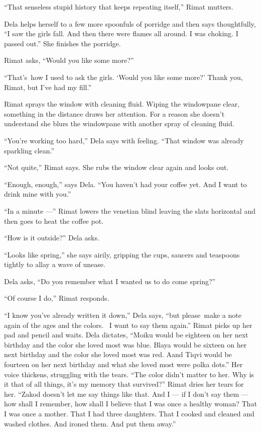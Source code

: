\documentclass[twoside,11pt,openany]{book}
\begin{document}
``That senseless stupid history that keeps repeating itself,'' Rimat mutters.

Dela helps herself to a few more spoonfuls of porridge and then says thoughtfully, ``I saw the girls fall.
And then there were flames all around. I was choking. I passed out.'' She finishes the porridge.

Rimat asks, ``Would you like some more?''

``That's~how I used to ask the girls. `Would you like some more?' Thank you, Rimat, but I've had my
fill.''

Rimat sprays the window with cleaning fluid. Wiping the windowpane clear, something{ }in the distance
draws her attention. For a reason she doesn't understand she blurs the windowpane with another spray of cleaning fluid.


``You're working too hard,'' Dela says with feeling. ``That window was already
sparkling clean.''

``Not quite,'' Rimat says. She rubs the window clear again and looks out.

``Enough, enough,'' says Dela. ``You haven't had your coffee yet.
And{ }I want to drink mine with you.''

``In a minute ---'' Rimat lowers the venetian blind leaving the slats horizontal and then goes
to heat the coffee pot.

``How is it outside?'' Dela asks.

``Looks like spring,'' she says airily, gripping the cups, saucers and teaspoons tightly to
allay a wave of unease.

Dela asks, ``Do you remember what I wanted us to do come spring?''

``Of course I do,'' Rimat responds.

``I know you've already written it down,'' Dela says, ``but please~make a note again of the ages and the
colors. ~I want to say them again.'' Rimat picks up her pad and pencil and waits. Dela dictates,
``Moiku would be eighteen on her next birthday and the color she loved most was blue. Blaya would be
sixteen on her next birthday and the color she loved most was red. Aand Tiqvi would be fourteen on her next birthday
and what she loved most were polka dots.'' Her voice thickens, struggling with the tears.
``The color didn't matter to her. Why is it that of all things, it's my memory that
survived?'' Rimat dries her tears for her. ``Zakod doesn't let me say things like that. And I
--- if I don't say them --- how shall I remember, how shall I believe that I was once a healthy woman? That I was once a
mother. That I had three daughters. That I cooked and cleaned and washed clothes. And ironed them. And put them
away.''
\end{document}
